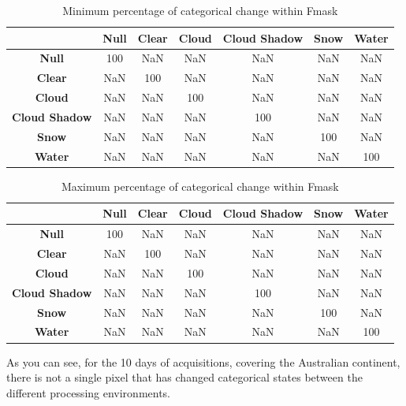 \documentclass[a4paper]{article}
\begin{document}
    \begin{table}[ht!]
      \caption{Minimum percentage of categorical change within Fmask}\label{table:5}
      \centering
      \begin{tabular}{ccccccc} \midrule
        & \textbf{Null} & \textbf{Clear} & \textbf{Cloud} & \textbf{Cloud Shadow} & \textbf{Snow} & \textbf{Water} \\ \midrule
        \textbf{Null} & 100 & NaN & NaN & NaN & NaN & NaN \\
        \textbf{Clear} & NaN & 100 & NaN & NaN & NaN & NaN \\
        \textbf{Cloud} & NaN & NaN & 100 & NaN & NaN & NaN \\
        \textbf{Cloud Shadow} & NaN & NaN & NaN & 100 & NaN & NaN \\
        \textbf{Snow} & NaN & NaN & NaN & NaN & 100 & NaN \\
        \textbf{Water} & NaN & NaN & NaN & NaN & NaN & 100 \\
      \end{tabular}
    \end{table}

    \begin{table}[ht!]
      \caption{Maximum percentage of categorical change within Fmask}\label{table:6}
      \centering
      \begin{tabular}{ccccccc} \midrule
        & \textbf{Null} & \textbf{Clear} & \textbf{Cloud} & \textbf{Cloud Shadow} & \textbf{Snow} & \textbf{Water} \\ \midrule
        \textbf{Null} & 100 & NaN & NaN & NaN & NaN & NaN \\
        \textbf{Clear} & NaN & 100 & NaN & NaN & NaN & NaN \\
        \textbf{Cloud} & NaN & NaN & 100 & NaN & NaN & NaN \\
        \textbf{Cloud Shadow} & NaN & NaN & NaN & 100 & NaN & NaN \\
        \textbf{Snow} & NaN & NaN & NaN & NaN & 100 & NaN \\
        \textbf{Water} & NaN & NaN & NaN & NaN & NaN & 100 \\
      \end{tabular}
    \end{table}

      \begin{flushleft}
        As you can see, for the 10 days of acquisitions, covering the Australian continent, there is not a single pixel that has changed categorical states between the different processing environments.
      \end{flushleft}
\end{document}
